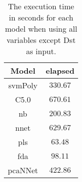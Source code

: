 \begin{table}[!ht]
	\centering
	\begin{tabular}{|c|c|}
		\hline
		Model & elapsed \\ \hline
		svmPoly & $330.67$ \\ \hline
		C5.0 & $670.61$ \\ \hline
		nb & $200.83$ \\ \hline
		nnet & $629.67$ \\ \hline
		pls & $63.48$ \\ \hline
		fda & $98.11$ \\ \hline
		pcaNNet & $422.86$ \\ \hline
	\end{tabular}
	\caption{The execution time in seconds for each model when using all variables except Dst as input.}
	\label{tab:time:noDst:total}
\end{table}
